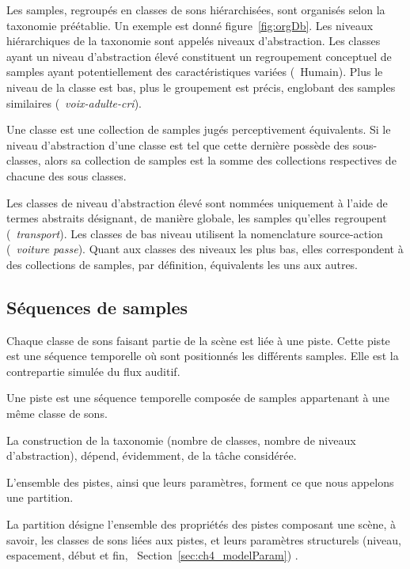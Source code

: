 Les samples, regroupés en classes de sons hiérarchisées, sont organisés selon la taxonomie préétablie. Un exemple est donné figure~\ref{fig:orgDb}. Les niveaux hiérarchiques de la taxonomie sont appelés niveaux d'abstraction. Les classes ayant un niveau d'abstraction élevé constituent un regroupement conceptuel de samples ayant potentiellement des caractéristiques variées (\eg~{Humain}). Plus le niveau de la classe est bas, plus le groupement est précis, englobant des samples similaires (\eg~\emph{voix-adulte-cri}). 

\begin{mydef}
Une classe est une collection de samples jugés perceptivement équivalents. Si le niveau d'abstraction d'une classe est tel que cette dernière possède des sous-classes, alors sa collection de samples est la somme des collections respectives de chacune des sous classes.
\end{mydef}

Les classes de niveau d'abstraction élevé sont nommées uniquement à l'aide de termes abstraits désignant, de manière globale, les samples qu'elles regroupent (\eg~\emph{transport}). Les classes de bas niveau utilisent la nomenclature source-action (\eg~\emph{voiture passe}). Quant aux classes des niveaux les plus bas, elles correspondent à des collections de samples, par définition, équivalents les uns aux autres.

\subsection{Séquences de samples}
\label{sec:ch4_seqSample}

Chaque classe de sons faisant partie de la scène est liée à une piste. Cette piste est une séquence temporelle où sont positionnés les différents samples. Elle est la contrepartie simulée du flux auditif.

\begin{mydef}
Une piste est une séquence temporelle composée de samples appartenant à une même classe de sons.
\end{mydef}

La construction de la taxonomie (nombre de classes, nombre de niveaux d'abstraction), dépend, évidemment, de la tâche considérée. 

L'ensemble des pistes, ainsi que leurs paramètres, forment ce que nous appelons une partition.

\begin{mydef}
La partition désigne l'ensemble des propriétés des pistes composant une scène, à savoir, les classes de sons liées aux pistes, et leurs paramètres structurels (niveau, espacement, début et fin, \cf~Section~\ref{sec:ch4_modelParam}) .
\end{mydef}

